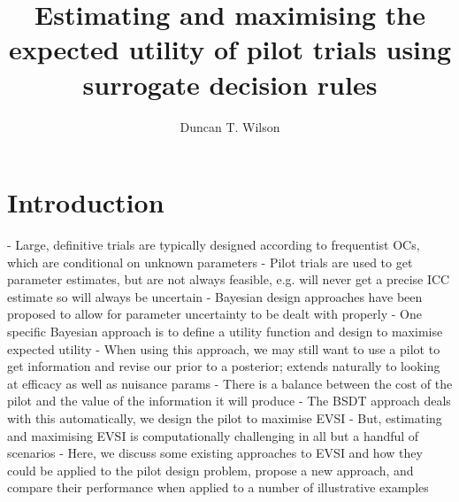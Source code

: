\documentclass[sagev, Crown]{sagej} %
\begin{document}

\title{Estimating and maximising the expected utility of pilot trials using surrogate decision rules}

\author{Duncan T. Wilson}%



\begin{abstract}

\end{abstract}


\maketitle

\section{Introduction}

- Large, definitive trials are typically designed according to frequentist OCs, which are conditional on unknown parameters
- Pilot trials are used to get parameter estimates, but are not always feasible, e.g. will never get a precise ICC estimate so will always be uncertain
- Bayesian design approaches have been proposed to allow for parameter uncertainty to be dealt with properly
- One specific Bayesian approach is to define a utility function and design to maximise expected utility
- When using this approach, we may still want to use a pilot to get information and revise our prior to a posterior; extends naturally to looking at efficacy as well as nuisance params
- There is a balance between the cost of the pilot and the value of the information it will produce
- The BSDT approach deals with this automatically, we design the pilot to maximise EVSI
- But, estimating and maximising EVSI is computationally challenging in all but a handful of scenarios
- Here, we discuss some existing approaches to EVSI and how they could be applied to the pilot design problem, propose a new approach, and compare their performance when applied to a number of illustrative examples
\end{document}
